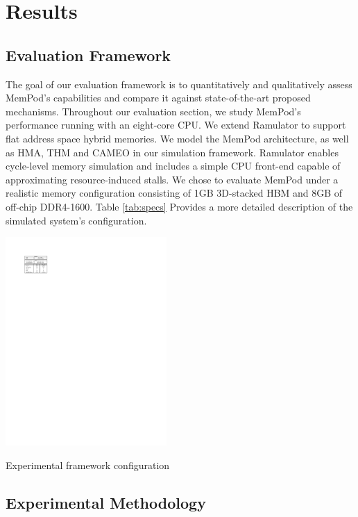 \section{Results}
\label{sec:Results}

\subsection{Evaluation Framework}
\label{sub:Evaluation}

The goal of our evaluation framework is to quantitatively and qualitatively assess MemPod's capabilities and compare it against state-of-the-art proposed mechanisms. Throughout our evaluation section, we study MemPod's performance running with an eight-core CPU. We extend Ramulator \cite{kim-ramulator} to support flat address space hybrid memories. We model the MemPod architecture,
as well as HMA, THM and CAMEO in our simulation framework. Ramulator enables 
cycle-level memory simulation and includes a simple CPU front-end capable of approximating resource-induced stalls. We chose to evaluate MemPod under a realistic memory configuration consisting of 1GB 3D-stacked HBM \cite{JEDEC-HBM-REVISED} and 8GB of off-chip DDR4-1600. Table \ref{tab:specs} Provides a more detailed description of the simulated system's configuration.

\begin{table}[t]
  \includegraphics[width=0.46\textwidth]{figures/specs_table.pdf}
  \caption{Experimental framework configuration}
  \label{tab:specs}
\end{table}

\subsection{Experimental Methodology}
\label{sub:Experimental}

